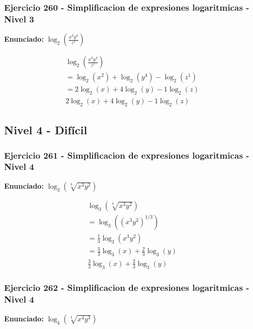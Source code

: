 \documentclass[12pt,a4paper]{article}
\begin{document}
\subsubsection*{Ejercicio 260 - Simplificacion de expresiones logaritmicas - Nivel 3}
\textbf{Enunciado:} \(\log_{2}\left(\frac{x^{2}y^{4}}{z^{1}}\right)\)

\[
\begin{aligned}
\log_{2}\left(\frac{x^{2}y^{4}}{z^{1}}\right)\\
=\log_{2}\left(x^{2}\right)+\log_{2}\left(y^{4}\right)-\log_{2}\left(z^{1}\right)\\
=2\log_{2}\left(x\right)+4\log_{2}\left(y\right)-1\log_{2}\left(z\right)\\
\boxed{2\log_{2}\left(x\right)+4\log_{2}\left(y\right)-1\log_{2}\left(z\right)}
\end{aligned}
\]


\newpage

\subsection*{Nivel 4 - Difícil}

\subsubsection*{Ejercicio 261 - Simplificacion de expresiones logaritmicas - Nivel 4}
\textbf{Enunciado:} \(\log_{3}\left(\sqrt[3]{x^{3}y^{2}}\right)\)

\[
\begin{aligned}
\log_{3}\left(\sqrt[3]{x^{3}y^{2}}\right)\\
=\log_{3}\left((x^{3}y^{2})^{1/3}\right)\\
=\frac{1}{3}\log_{3}\left(x^{3}y^{2}\right) \\
=\frac{3}{3}\log_{3}\left(x\right)+\frac{2}{3}\log_{3}\left(y\right)\\
\boxed{\frac{3}{3}\log_{3}\left(x\right)+\frac{2}{3}\log_{3}\left(y\right)}
\end{aligned}
\]


\subsubsection*{Ejercicio 262 - Simplificacion de expresiones logaritmicas - Nivel 4}
\textbf{Enunciado:} \(\log_{4}\left(\sqrt[4]{x^{4}y^{3}}\right)\)
\end{document}
